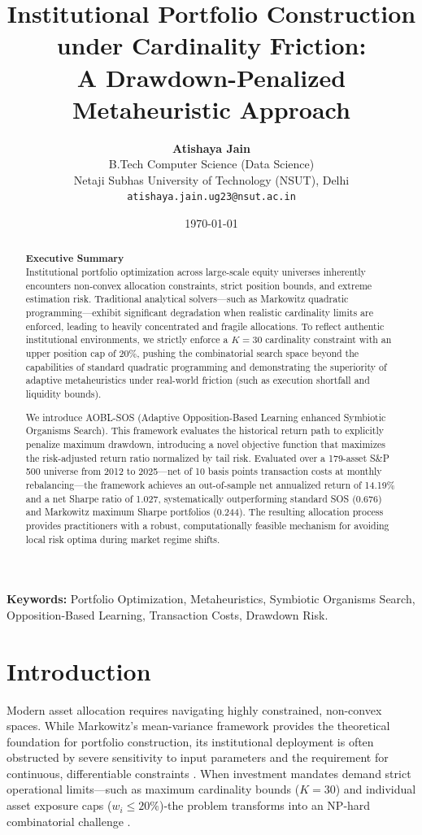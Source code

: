 \documentclass[11pt,a4paper]{article}
\title{\textbf{Institutional Portfolio Construction under Cardinality Friction:\\A Drawdown-Penalized Metaheuristic Approach}}
\author{
    \textbf{Atishaya Jain}\\
    \small B.Tech Computer Science (Data Science)\\
    \small Netaji Subhas University of Technology (NSUT), Delhi\\
    \small \texttt{atishaya.jain.ug23@nsut.ac.in}
}
\date{\today}
\begin{document}
\maketitle

\begin{abstract}
\textbf{Executive Summary}\\
Institutional portfolio optimization across large-scale equity universes inherently encounters non-convex allocation constraints, strict position bounds, and extreme estimation risk. Traditional analytical solvers—such as Markowitz quadratic programming—exhibit significant degradation when realistic cardinality limits are enforced, leading to heavily concentrated and fragile allocations. To reflect authentic institutional environments, we strictly enforce a $K=30$ cardinality constraint with an upper position cap of 20\%, pushing the combinatorial search space beyond the capabilities of standard quadratic programming and demonstrating the superiority of adaptive metaheuristics under real-world friction (such as execution shortfall and liquidity bounds).

We introduce AOBL-SOS (Adaptive Opposition-Based Learning enhanced Symbiotic Organisms Search). This framework evaluates the historical return path to explicitly penalize maximum drawdown, introducing a novel objective function that maximizes the risk-adjusted return ratio normalized by tail risk. Evaluated over a 179-asset S\&P 500 universe from 2012 to 2025—net of 10 basis points transaction costs at monthly rebalancing—the framework achieves an out-of-sample net annualized return of 14.19\% and a net Sharpe ratio of 1.027, systematically outperforming standard SOS (0.676) and Markowitz maximum Sharpe portfolios (0.244). The resulting allocation process provides practitioners with a robust, computationally feasible mechanism for avoiding local risk optima during market regime shifts.
\end{abstract}

\noindent \textbf{Keywords:} Portfolio Optimization, Metaheuristics, Symbiotic Organisms Search, Opposition-Based Learning, Transaction Costs, Drawdown Risk.

\section{Introduction}
Modern asset allocation requires navigating highly constrained, non-convex spaces. While Markowitz's \cite{markowitz1952} mean-variance framework provides the theoretical foundation for portfolio construction, its institutional deployment is often obstructed by severe sensitivity to input parameters \cite{michaud1989} and the requirement for continuous, differentiable constraints \cite{ledoit2004}. When investment mandates demand strict operational limits—such as maximum cardinality bounds ($K=30$) and individual asset exposure caps ($w_i \le 20\%$)-the problem transforms into an NP-hard combinatorial challenge \cite{chang2000}.
\end{document}
